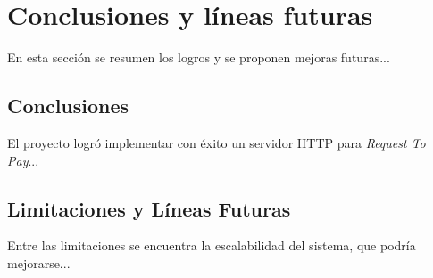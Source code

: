 \section{Conclusiones y líneas futuras}
\label{sec:Conclusiones}
En esta sección se resumen los logros y se proponen mejoras futuras...

\subsection{Conclusiones}
\label{subsec:ConclusionesSub}
El proyecto logró implementar con éxito un servidor HTTP para \textit{Request To Pay}...

\subsection{Limitaciones y Líneas Futuras}
\label{subsec:LimitacionesFuturas}
Entre las limitaciones se encuentra la escalabilidad del sistema, que podría mejorarse...
